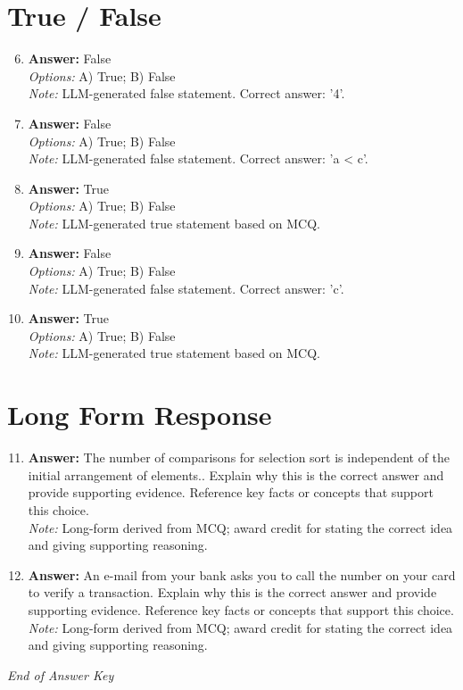 \documentclass[12pt]{article}
\begin{document}
\section*{True / False}
\begin{enumerate}[label=\arabic*.]
\setcounter{enumi}{5}
\item \textbf{Answer:} False
\\ \textit{Options:} A) True; B) False
\\ \textit{Note:} LLM-generated false statement. Correct answer: '4'.
\item \textbf{Answer:} False
\\ \textit{Options:} A) True; B) False
\\ \textit{Note:} LLM-generated false statement. Correct answer: 'a \textless{} c'.
\item \textbf{Answer:} True
\\ \textit{Options:} A) True; B) False
\\ \textit{Note:} LLM-generated true statement based on MCQ.
\item \textbf{Answer:} False
\\ \textit{Options:} A) True; B) False
\\ \textit{Note:} LLM-generated false statement. Correct answer: 'c'.
\item \textbf{Answer:} True
\\ \textit{Options:} A) True; B) False
\\ \textit{Note:} LLM-generated true statement based on MCQ.
\end{enumerate}

\section*{Long Form Response}
\begin{enumerate}[label=\arabic*.]
\setcounter{enumi}{10}
\item \textbf{Answer:} The number of comparisons for selection sort is independent of the initial arrangement of elements.. Explain why this is the correct answer and provide supporting evidence. Reference key facts or concepts that support this choice.
\\ \textit{Note:} Long-form derived from MCQ; award credit for stating the correct idea and giving supporting reasoning.
\item \textbf{Answer:} An e-mail from your bank asks you to call the number on your card to verify a transaction. Explain why this is the correct answer and provide supporting evidence. Reference key facts or concepts that support this choice.
\\ \textit{Note:} Long-form derived from MCQ; award credit for stating the correct idea and giving supporting reasoning.
\end{enumerate}

\vfill
\noindent\textit{End of Answer Key}
\end{document}
